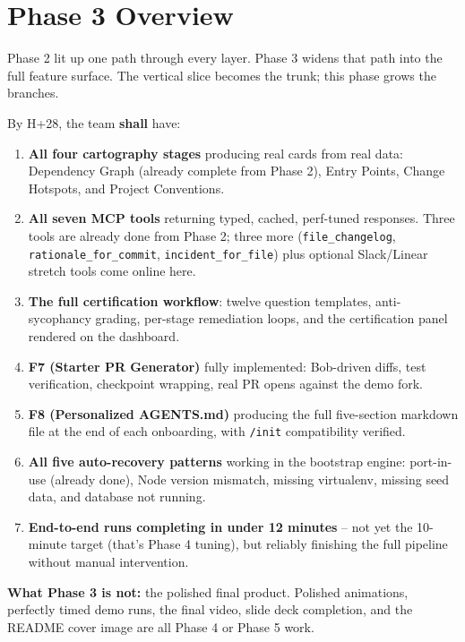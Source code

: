 \documentclass[11pt,letterpaper]{article}
\newcommand{\shall}{\textbf{shall}}
\begin{document}
{\hypersetup{linkcolor=ibmdark}\tableofcontents}
\newpage

\section{Phase 3 Overview}

Phase 2 lit up one path through every layer. Phase 3 widens that path into the full feature surface. The vertical slice becomes the trunk; this phase grows the branches.

By H+28, the team \shall{} have:

\begin{enumerate}
  \item \textbf{All four cartography stages} producing real cards from real data: Dependency Graph (already complete from Phase 2), Entry Points, Change Hotspots, and Project Conventions.
  \item \textbf{All seven MCP tools} returning typed, cached, perf-tuned responses. Three tools are already done from Phase 2; three more (\texttt{file\_changelog}, \texttt{rationale\_for\_commit}, \texttt{incident\_for\_file}) plus optional Slack/Linear stretch tools come online here.
  \item \textbf{The full certification workflow}: twelve question templates, anti-sycophancy grading, per-stage remediation loops, and the certification panel rendered on the dashboard.
  \item \textbf{F7 (Starter PR Generator)} fully implemented: Bob-driven diffs, test verification, checkpoint wrapping, real PR opens against the demo fork.
  \item \textbf{F8 (Personalized AGENTS.md)} producing the full five-section markdown file at the end of each onboarding, with \texttt{/init} compatibility verified.
  \item \textbf{All five auto-recovery patterns} working in the bootstrap engine: port-in-use (already done), Node version mismatch, missing virtualenv, missing seed data, and database not running.
  \item \textbf{End-to-end runs completing in under 12 minutes} -- not yet the 10-minute target (that's Phase 4 tuning), but reliably finishing the full pipeline without manual intervention.
\end{enumerate}

\textbf{What Phase 3 is not:} the polished final product. Polished animations, perfectly timed demo runs, the final video, slide deck completion, and the README cover image are all Phase 4 or Phase 5 work.
\end{document}
